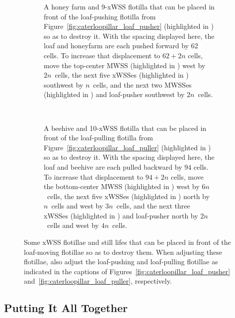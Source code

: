 \begin{figure}[!htb]
	\centering
	\begin{subfigure}[b]{\textwidth}
		\centering
		\caption{A honey farm and 9-xWSS flotilla that can be placed in front of the loaf-pushing flotilla from Figure~\ref{fig:caterloopillar_loaf_pusher} (highlighted in ) so as to destroy it. With the spacing displayed here, the loaf and honeyfarm are each pushed forward by $62$ cells. To increase that displacement to $62 + 2n$ cells, move the top-center MWSS (highlighted in ) west by $2n$~cells, the next five xWSSes (highlighted in ) southwest by $n$~cells, and the next two MWSSes (highlighted in ) and loaf-pusher southwest by $2n$~cells.}\label{fig:caterloopillar_front_end}
	\end{subfigure}\\[0.3cm]
	\begin{subfigure}[b]{\textwidth}
		\centering
		\caption{A beehive and 10-xWSS flotilla that can be placed in front of the loaf-pulling flotilla from Figure~\ref{fig:caterloopillar_loaf_puller} (highlighted in ) so as to destroy it. With the spacing displayed here, the loaf and beehive are each pulled backward by $94$ cells. To increase that displacement to $94 + 2n$ cells, move the bottom-center MWSS (highlighted in ) west by $6n$~cells, the next five xWSSes (highlighted in ) north by $n$~cells and west by $3n$~cells, and the next three xWSSes (highlighted in ) and loaf-pusher north by $2n$~cells and west by $4n$~cells.}\label{fig:caterloopillar_back_end}
	\end{subfigure}
	\caption{Some xWSS flotillae and still lifes that can be placed in front of the loaf-moving flotillae so as to destroy them. When adjusting these flotillae, also adjust the loaf-pushing and loaf-pulling flotillae as indicated in the captions of Figures~\ref{fig:caterloopillar_loaf_pusher} and~\ref{fig:caterloopillar_loaf_puller}, respectively.}\label{fig:caterloopillar_front_back}
\end{figure}


\subsection{Putting It All Together}\label{sec:caterloopillar_itself}

